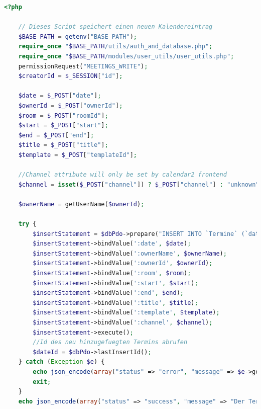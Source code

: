 \documentclass[12pt]{article}
\begin{document}
\begin{lstlisting}[language=PHP]
    <?php

    // Dieses Script speichert einen neuen Kalendereintrag
    $BASE_PATH = getenv("BASE_PATH");
    require_once "$BASE_PATH/utils/auth_and_database.php";
    require_once "$BASE_PATH/modules/user_utils/user_utils.php";
    permissionRequest("MEETINGS_WRITE");
    $creatorId = $_SESSION["id"];
    
    $date = $_POST["date"];
    $ownerId = $_POST["ownerId"];
    $room = $_POST["roomId"];
    $start = $_POST["start"];
    $end = $_POST["end"];
    $title = $_POST["title"];
    $template = $_POST["templateId"];
    
    //Channel attribute will only be set by calendar2 frontend
    $channel = isset($_POST["channel"]) ? $_POST["channel"] : "unknown";
    
    $ownerName = getUserName($ownerId);
    
    try {
        $insertStatement = $dbPdo->prepare("INSERT INTO `Termine` (`date`,`owner`,`ownerId`,`room`,`start`,`end`,`title`,`template`,`channel`) VALUES (:date,:ownerName,:ownerId,:room,:start,:end,:title,:template,:channel);");
        $insertStatement->bindValue(':date', $date);
        $insertStatement->bindValue(':ownerName', $ownerName);
        $insertStatement->bindValue(':ownerId', $ownerId);
        $insertStatement->bindValue(':room', $room);
        $insertStatement->bindValue(':start', $start);
        $insertStatement->bindValue(':end', $end);
        $insertStatement->bindValue(':title', $title);
        $insertStatement->bindValue(':template', $template);
        $insertStatement->bindValue(':channel', $channel);
        $insertStatement->execute();
        //Id des neu hinzugefuegten Termins abrufen
        $dateId = $dbPdo->lastInsertId();
    } catch (Exception $e) {
        echo json_encode(array("status" => "error", "message" => $e->getMessage()));
        exit;
    }
    echo json_encode(array("status" => "success", "message" => "Der Termin wurde erstellt", "dateId" => $dateId));

\end{lstlisting}
\end{document}
